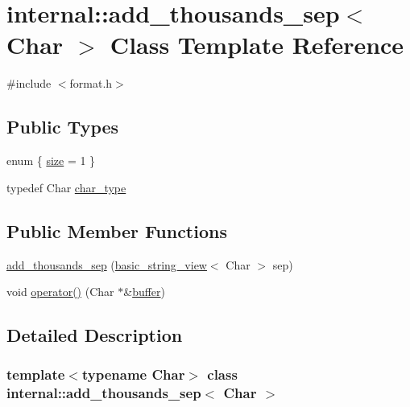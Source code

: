 \hypertarget{classinternal_1_1add__thousands__sep}{}\section{internal\+:\+:add\+\_\+thousands\+\_\+sep$<$ Char $>$ Class Template Reference}
\label{classinternal_1_1add__thousands__sep}


{\ttfamily \#include $<$format.\+h$>$}

\subsection*{Public Types}
\begin{DoxyCompactItemize}
\item 
enum \{ \hyperlink{classinternal_1_1add__thousands__sep_ae0d58a058f1e161a84192d6bedc42ad6a334d3f7a2d1967799e0196e1eac1f1be}{size} = 1
 \}
\item 
typedef Char \hyperlink{classinternal_1_1add__thousands__sep_af64be52350735e91034ea2ca6bd43481}{char\+\_\+type}
\end{DoxyCompactItemize}
\subsection*{Public Member Functions}
\begin{DoxyCompactItemize}
\item 
\hyperlink{classinternal_1_1add__thousands__sep_a87ae958dcd59c0191ac976ef70662827}{add\+\_\+thousands\+\_\+sep} (\hyperlink{classbasic__string__view}{basic\+\_\+string\+\_\+view}$<$ Char $>$ sep)
\item 
void \hyperlink{classinternal_1_1add__thousands__sep_a5a5f664cc8edbaccf37fbb1399366c5e}{operator()} (Char $\ast$\&\hyperlink{namespaceinternal_a5fcdbc3efad1f390e6c3f0fdafa56122}{buffer})
\end{DoxyCompactItemize}


\subsection{Detailed Description}
\subsubsection*{template$<$typename Char$>$\newline
class internal\+::add\+\_\+thousands\+\_\+sep$<$ Char $>$}



